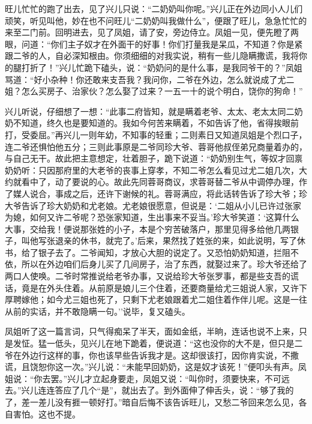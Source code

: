 旺儿忙忙的跑了出去，见了兴儿只说：``二奶奶叫你呢。''兴儿正在外边同小人儿们顽笑，听见叫他，妙在也不问旺儿``二奶奶叫我做什么''，便跟了旺儿，急急忙忙的来至二门前。回明进去，见了凤姐，请了安，旁边侍立。凤姐一见，便先瞪了两眼，问道：``你们主子奴才在外面干的好事！你们打量我是呆瓜，不知道？你是紧跟二爷的人，自必深知根由。你须细细的对我实说，稍有一些儿隐瞒撒谎，我将你的腿打折了！''兴儿忙跪下磕头，说：``奶奶问的是什么事，是我同爷干的？''凤姐骂道：``好小杂种！你还敢来支吾我？我问你，二爷在外边，怎么就说成了尤二姐？怎么买房子、治家伙？怎么娶了过来？一五一十的说个明白，饶你的狗命！''

兴儿听说，仔细想了一想：``此事二府皆知，就是瞒着老爷、太太、老太太同二奶奶不知道，终久也是要知道的。我如今何苦来瞒着，不如告诉了他，省得挨眼前打，受委屈。''再兴儿一则年幼，不知事的轻重；二则素日又知道凤姐是个烈口子，连二爷还惧怕他五分；三则此事原是二爷同珍大爷、蓉哥他叔侄弟兄商量着办的，与自己无干。故此把主意想定，壮着胆子，跪下说道：``奶奶别生气，等奴才回禀奶奶听：只因那府里的大老爷的丧事上穿孝，不知二爷怎么看见过尤二姐几次，大约就看中了，动了要说的心。故此先同蓉哥商议，求蓉哥替二爷从中调停办理，作了媒人说合，事成之后，还许下谢候的礼。蓉哥满应，将此话转告诉了珍大爷；珍大爷告诉了珍大奶奶和尤老娘。尤老娘很愿意，但说是：`二姐从小儿已许过张家为媳，如何又许二爷呢？恐张家知道，生出事来不妥当。'珍大爷笑道：`这算什么大事，交给我！便说那张姓的小子，本是个穷苦破落户，那里见得多给他几两银子，叫他写张退亲的休书，就完了。'后来，果然找了姓张的来，如此说明，写了休书，给了银子去了。二爷闻知，才放心大胆的说定了。又恐怕奶奶知道，拦阻不依，所以在外边咱们后身儿买了几间房子，治了东西，就娶过来了。珍大爷还给了两口人使唤。二爷时常推说给老爷办事，又说给珍大爷张罗事，都是些支吾的谎话，竟是在外头住着。从前原是娘儿三个住着，还要商量给尤三姐说人家，又许下厚聘嫁他；如今尤三姐也死了，只剩下尤老娘跟着尤二姐住着作伴儿呢。这是一往从前的实话，并不敢隐瞒一句。''说毕，复又磕头。

凤姐听了这一篇言词，只气得痴呆了半天，面如金纸，半晌，连话也说不上来，只是发怔。猛一低头，见兴儿在地下跪着，便说道：``这也没你的大不是，但只是二爷在外边行这样的事，你也该早些告诉我才是。这却很该打，因你肯实说，不撒谎，且饶恕你这一次。''兴儿说：``未能早回奶奶，这是奴才该死！''便叩头有声。凤姐说：``你去罢。''兴儿才立起身要走，凤姐又说：``叫你时，须要快来，不可远去。''兴儿连连答应了几个``是''，就出去了。到外面伸了伸舌头，说：``够了我的了，差一差儿没有捱一顿好打。''暗自后悔不该告诉旺儿，又愁二爷回来怎么见，各自害怕。这也不提。

